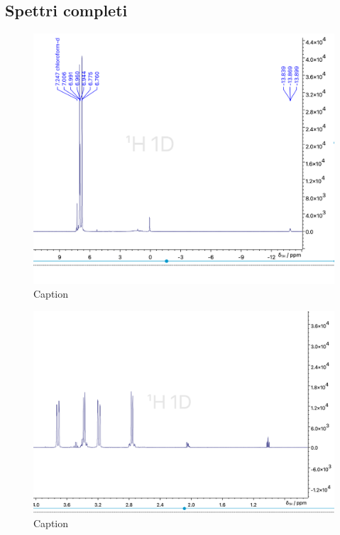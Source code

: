 \begin{appendix}
\section{Spettri completi}

\begin{figure}
    \centering
    \includegraphics[width=\linewidth]{Relazione/foto/CoH_peak_calcall.png}
    \caption{Caption}
    \label{fig:cohfull}
\end{figure}


\begin{figure}
    \centering
    \includegraphics[width=\linewidth]{Relazione/foto/Dinosar_full.png}
    \caption{Caption}
    \label{fig:cohfull}
\end{figure}





\end{appendix}




\clearpage
\printbibliography